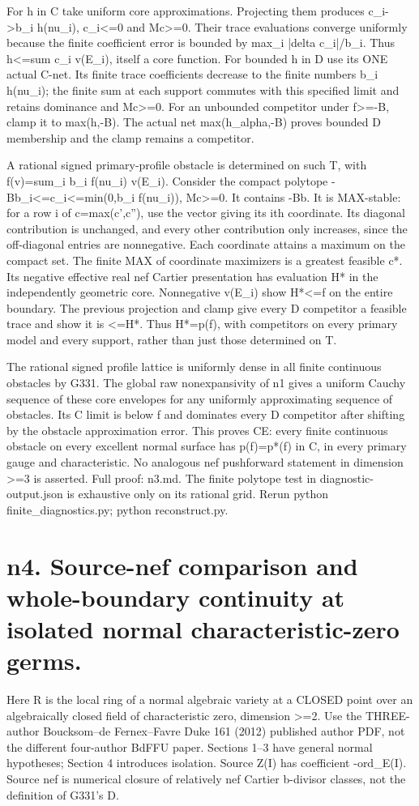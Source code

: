 \documentclass[11pt]{article}
\begin{document}
For h in C take uniform core approximations. Projecting them produces c\_i->b\_i h(nu\_i), c\_i<=0 and Mc>=0. Their trace evaluations converge uniformly because the finite coefficient error is bounded by max\_i |delta c\_i|/b\_i. Thus h<=sum c\_i v(E\_i), itself a core function. For bounded h in D use its ONE actual C-net. Its finite trace coefficients decrease to the finite numbers b\_i h(nu\_i); the finite sum at each support commutes with this specified limit and retains dominance and Mc>=0. For an unbounded competitor under f>=-B, clamp it to max(h,-B). The actual net max(h\_alpha,-B) proves bounded D membership and the clamp remains a competitor.

A rational signed primary-profile obstacle is determined on such T, with
 f(v)=sum\_i b\_i f(nu\_i) v(E\_i).
Consider the compact polytope -Bb\_i<=c\_i<=min(0,b\_i f(nu\_i)), Mc>=0. It contains -Bb. It is MAX-stable: for a row i of c=max(c',c''), use the vector giving its ith coordinate. Its diagonal contribution is unchanged, and every other contribution only increases, since the off-diagonal entries are nonnegative. Each coordinate attains a maximum on the compact set. The finite MAX of coordinate maximizers is a greatest feasible c*. Its negative effective real nef Cartier presentation has evaluation H* in the independently geometric core. Nonnegative v(E\_i) show H*<=f on the entire boundary. The previous projection and clamp give every D competitor a feasible trace and show it is <=H*. Thus H*=p(f), with competitors on every primary model and every support, rather than just those determined on T.

The rational signed profile lattice is uniformly dense in all finite continuous obstacles by G331. The global raw nonexpansivity of n1 gives a uniform Cauchy sequence of these core envelopes for any uniformly approximating sequence of obstacles. Its C limit is below f and dominates every D competitor after shifting by the obstacle approximation error. This proves CE: every finite continuous obstacle on every excellent normal surface has p(f)=p*(f) in C, in every primary gauge and characteristic. No analogous nef pushforward statement in dimension >=3 is asserted. Full proof: n3.md. The finite polytope test in diagnostic-output.json is exhaustive only on its rational grid. Rerun python finite\_diagnostics.py; python reconstruct.py.

\section*{n4. Source-nef comparison and whole-boundary continuity at isolated normal characteristic-zero germs.}
Here R is the local ring of a normal algebraic variety at a CLOSED point over an algebraically closed field of characteristic zero, dimension >=2. Use the THREE-author Boucksom--de Fernex--Favre Duke 161 (2012) published author PDF, not the different four-author BdFFU paper. Sections 1--3 have general normal hypotheses; Section 4 introduces isolation. Source Z(I) has coefficient -ord\_E(I). Source nef is numerical closure of relatively nef Cartier b-divisor classes, not the definition of G331's D.
\end{document}
